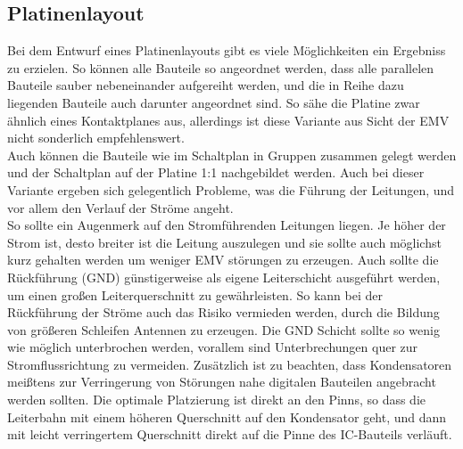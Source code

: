 \subsection{Platinenlayout}
Bei dem Entwurf eines Platinenlayouts gibt es viele Möglichkeiten ein Ergebniss zu erzielen. So können alle Bauteile so angeordnet werden, dass alle parallelen Bauteile sauber nebeneinander aufgereiht werden, und die in Reihe dazu liegenden Bauteile auch darunter angeordnet sind. So sähe die Platine zwar ähnlich eines Kontaktplanes aus, allerdings ist diese Variante aus Sicht der EMV nicht sonderlich empfehlenswert.\\
Auch können die Bauteile wie im Schaltplan in Gruppen zusammen gelegt werden und der Schaltplan auf der Platine 1:1 nachgebildet werden. Auch bei dieser Variante ergeben sich gelegentlich Probleme, was die Führung der Leitungen, und vor allem den Verlauf der Ströme angeht.\\
So sollte ein Augenmerk auf den Stromführenden Leitungen liegen. Je höher der Strom ist, desto breiter ist die Leitung auszulegen und sie sollte auch möglichst kurz gehalten werden um weniger EMV störungen zu erzeugen. Auch sollte die Rückführung (GND) günstigerweise als eigene Leiterschicht ausgeführt werden, um einen großen Leiterquerschnitt zu gewährleisten. So kann bei der Rückführung der Ströme auch das Risiko vermieden werden, durch die Bildung von größeren Schleifen Antennen zu erzeugen. Die GND Schicht sollte so wenig wie möglich unterbrochen werden, vorallem sind Unterbrechungen quer zur Stromflussrichtung zu vermeiden. Zusätzlich ist zu beachten, dass Kondensatoren meißtens zur Verringerung von Störungen nahe digitalen Bauteilen angebracht werden sollten. Die optimale Platzierung ist direkt an den Pinns, so dass die Leiterbahn mit einem höheren Querschnitt auf den Kondensator geht, und dann mit leicht verringertem Querschnitt direkt auf die Pinne des IC-Bauteils verläuft.


